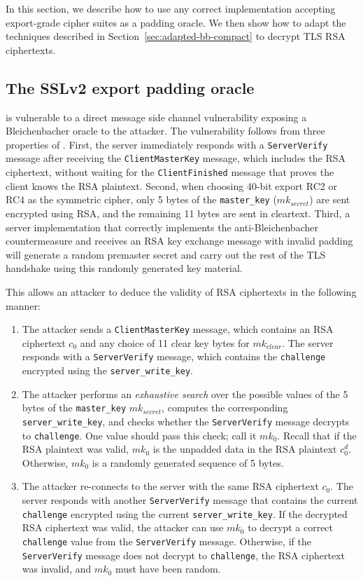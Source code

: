 In this section, we describe how to use any correct \ssltwo implementation accepting export-grade cipher suites as a padding oracle.  We then show how to adapt the techniques described in Section~\ref{sec:adapted-bb-compact} to decrypt TLS RSA ciphertexts.

\subsection{The SSLv2 export padding oracle} 
\label{vulnerability}
\ssltwo is vulnerable to a direct message side channel vulnerability exposing a Bleichenbacher oracle to the attacker.
The vulnerability follows from three properties of \ssltwo.  First, the server immediately responds with a \texttt{ServerVerify} message after receiving the \texttt{ClientMasterKey} message, which includes the RSA ciphertext, without waiting for the \texttt{ClientFinished} message that proves the client knows the RSA plaintext.  Second, when choosing 40-bit export RC2 or RC4 as the symmetric cipher, only 5 bytes of the \texttt{master\_key} ($mk_{secret}$) are sent encrypted using RSA, and the remaining 11 bytes are sent in cleartext.  Third, a server
implementation that correctly implements the anti-Bleichenbacher countermeasure 
and receives an RSA key exchange message with invalid
padding will generate a random premaster secret and carry out the
rest of the TLS handshake using this randomly generated key material.

This allows an attacker to deduce the validity of RSA ciphertexts in the following manner:

\begin{enumerate}
	\item The attacker sends a \texttt{ClientMasterKey} message, which contains an RSA ciphertext $c_0$ and any choice of 11 clear key bytes for $mk_{clear}$. The server responds with a \texttt{ServerVerify} message, which contains the \texttt{challenge} encrypted using the \texttt{server\_write\_key}.
	\item The attacker performs an \textit{exhaustive search} over the possible values of the 5 bytes of the \texttt{master\_key} $mk_{secret}$, computes the corresponding \texttt{server\_write\_key}, and checks whether the \texttt{ServerVerify} message decrypts to \texttt{challenge}. One value should pass this check; call it $mk_0$. Recall that if the RSA plaintext was valid, $mk_0$ is the unpadded data in the RSA plaintext $c_0 ^d$. Otherwise, $mk_0$ is a randomly generated sequence of 5 bytes.
	\item The attacker re-connects to the server with the same RSA ciphertext $c_0$. The server responds with another \texttt{ServerVerify} message that contains the current \texttt{challenge} encrypted using the current \texttt{server\_write\_key}. If the decrypted RSA ciphertext was valid, the attacker can use $mk_0$ to decrypt a correct \texttt{challenge} value from the \texttt{ServerVerify} message. Otherwise, if the \texttt{ServerVerify} message does not decrypt to \texttt{challenge}, the RSA ciphertext was invalid, and $mk_0$ must have been random.
\end{enumerate}

